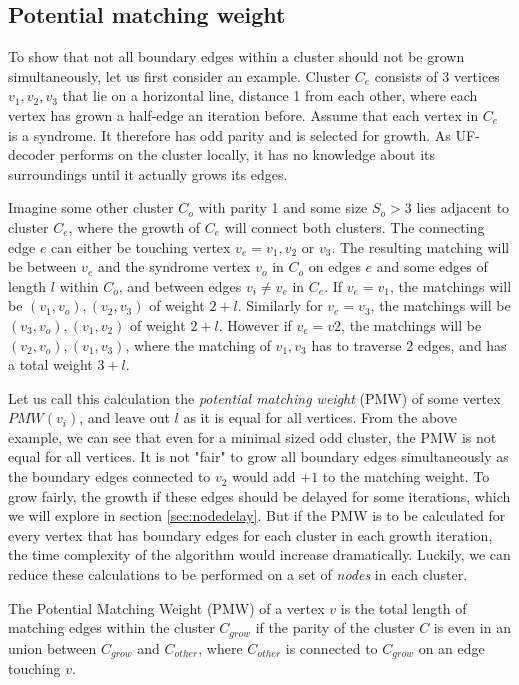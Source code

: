 \subsection{Potential matching weight}

To show that not all boundary edges within a cluster should not be grown simultaneously, let us first consider an example. Cluster $C_e$ consists of 3 vertices $v_1, v_2, v_3$ that lie on a horizontal line, distance 1 from each other, where each vertex has grown a half-edge an iteration before. Assume that each vertex in $C_e$ is a syndrome. It therefore has odd parity and is selected for growth. As UF-decoder performs on the cluster locally, it has no knowledge about its surroundings until it actually grows its edges.

Imagine some other cluster $C_o$ with parity 1 and some size $S_o > 3$ lies adjacent to cluster $C_e$, where the growth of $C_e$ will connect both clusters. The connecting edge $e$ can either be touching vertex $v_e = v_1, v_2$ or $v_3$. The resulting matching will be between $v_e$ and the syndrome vertex $v_o$ in $C_o$ on edges $e$ and some edges of length $l$ within $C_o$, and between edges $v_i \neq v_e$ in $C_e$. If $v_e = v_1$, the matchings will be $(v_1, v_o), (v_2, v_3)$ of weight $2 + l$. Similarly for $v_e = v_3$, the matchings will be $(v_3, v_o), (v_1, v_2)$ of weight $2 + l$. However if $v_e = v2$, the matchings will be $(v_2, v_o), (v_1, v_3)$, where the matching of $v_1, v_3$ has to traverse 2 edges, and has a total weight $3 + l$.

Let us call this calculation the \emph{potential matching weight} (PMW) of some vertex $PMW(v_i)$, and leave out $l$ as it is equal for all vertices. From the above example, we can see that even for a minimal sized odd cluster, the PMW is not equal for all vertices. It is not "fair" to grow all boundary edges simultaneously as the boundary edges connected to $v_2$ would add $+1$ to the matching weight. To grow fairly, the growth if these edges should be delayed for some iterations, which we will explore in section \ref{sec:nodedelay}. But if the PMW is to be calculated for every vertex that has boundary edges for each cluster in each growth iteration, the time complexity of the algorithm would increase dramatically. Luckily, we can reduce these calculations to be performed on a set of \emph{nodes} in each cluster.

\begin{lemma}
  The Potential Matching Weight (PMW) of a vertex $v$ is the total length of matching edges within the cluster $C_{grow}$ if the parity of the cluster $C$ is even in an union between $C_{grow}$ and $C_{other}$, where $C_{other}$ is connected to $C_{grow}$ on an edge touching $v$.
\end{lemma}

